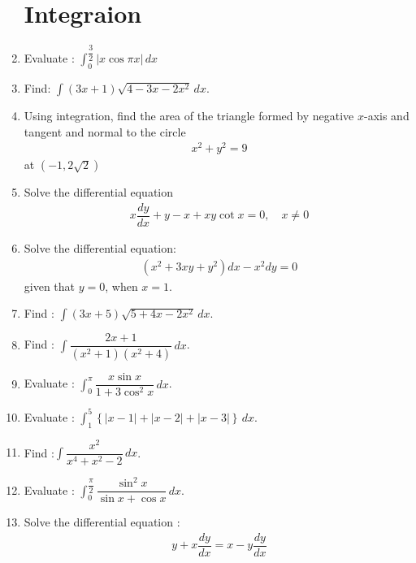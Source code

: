 \documentclass[12pt,-letter paper]{article}
\theoremstyle{remark}
\providecommand{\brak}[1]{\ensuremath{\left(#1\right)}}
\providecommand{\cbrak}[1]{\ensuremath{\left\{#1\right\}}}
\providecommand{\abs}[1]{\left\vert#1\right\vert}
\begin{document}
\begin{enumerate}
            \section{Integraion}
      \item Evaluate : $\int_{0}^{\dfrac{3}{2}} \abs{x \cos \pi x}\,dx$
      \item Find: $\int \brak{3x +1}\sqrt{4-3x-2x^2} \,dx$.
      \item Using integration, find the area of the triangle formed by negative $x$-axis and tangent and normal to the circle
            \begin{align*}
                  x^2 + y^2 =9
            \end{align*}
            at \brak{-1,2\sqrt{2}}
      \item Solve the differential equation
            \begin{align*}
                  x\dfrac{dy}{dx} +y -x +xy \cot x= 0, \quad x\neq 0
            \end{align*}
      \item Solve the differential equation:
            \begin{align*}
                  \brak{x^2+3xy+y^2}dx -x^2dy = 0
            \end{align*}
            given that $y=0$, when $x=1$.
      \item Find : $\int \brak{3x+5}\sqrt{5+4x-2x^2}\,dx$.
      \item Find : $\int \dfrac{2x+1}{\brak{x^2+1}\brak{x^2+4}}\,dx$.
      \item Evaluate : $\int_{0}^{\pi}\dfrac{x\sin x}{1+3\cos^2 x}\,dx$.
      \item Evaluate : $\int_{1}^{5}\cbrak{\abs{x-1}+\abs{x-2}+\abs{x-3}}\,dx$.
      \item Find :$\int \dfrac{x^2}{x^4 + x^2 -2}\,dx$.
      \item Evaluate : $\int_{0}^{\dfrac{\pi}{2}} \dfrac{\sin^2 x}{\sin x + \cos x} \,dx$.
      \item Solve the differential equation :
            \begin{align*}
                  y+ x\dfrac{dy}{dx} = x-y\dfrac{dy}{dx}
            \end{align*}

\end{enumerate}
\end{document}
